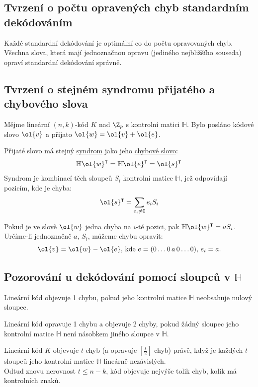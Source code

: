 \subsection{Tvrzení o počtu opravených chyb standardním dekódováním}
Každé standardní dekódování je optimální co do počtu opravovaných chyb. Všechna slova, která mají jednoznačnou opravu (jediného nejbližšího souseda) opraví standardní dekódování správně.

\subsection{Tvrzení o stejném syndromu přijatého a chybového slova}
Mějme lineární $(n,k)$-kód $K$ nad $\Z_p$ s kontrolní matici $\mathbb{H}$. Bylo posláno kódové slovo $\ol{v}$ a přijato $\ol{w} = \ol{v} + \ol{e}$.

Přijaté slovo má stejný \hyperref[syndrom]{syndrom} jako jeho \hyperref[chybSlovo]{chybové slovo}:
\begin{equation}
	\mathbb{H}\ol{w}^\intercal = \mathbb{H}\ol{e}^\intercal = \ol{s}^\intercal
\end{equation}
Syndrom je kombinací těch sloupců $S_i$ kontrolní matice $\mathbb{H}$, jež odpovídají pozicím, kde je chyba:
\begin{equation}
	\ol{s}^\intercal = \sum_{e_i \not= 0} e_i S_i
\end{equation}

Pokud je ve slově $\ol{w}$ jedna chyba na $i$-té pozici, pak $\mathbb{H}\ol{w}^\intercal = a S_i$. Určíme-li jednoznačně $a$, $S_i$, můžeme chybu opravit:
\begin{equation}
	\ol{v} = \ol{w} - \ol{e}, \, \text{kde } e = (0 \dots 0 \, a \, 0 \dots 0), \, e_i = a.
\end{equation}

\subsection{Pozorování u dekódování pomocí sloupců v \texorpdfstring{$\mathbb{H}$}{H}}
Lineární kód objevuje 1 chybu, pokud jeho kontrolní matice $\mathbb{H}$ neobsahuje nulový sloupec.

Lineární kód opravuje 1 chybu a objevuje 2 chyby, pokud žádný sloupec jeho kontrolní matice $\mathbb{H}$ není násobkem jiného sloupce v $\mathbb{H}$.

Lineární kód $K$ objevuje $t$ chyb (a opravuje $\left[\frac{t}{2}\right]$ chyb) právě, když je každých $t$ sloupců jeho kontrolní matice $\mathbb{H}$ lineárně nezávislých.\\
Odtud znovu nerovnost $t \leq n-k$, kód objevuje nejvýše tolik chyb, kolik má kontrolních znaků.

